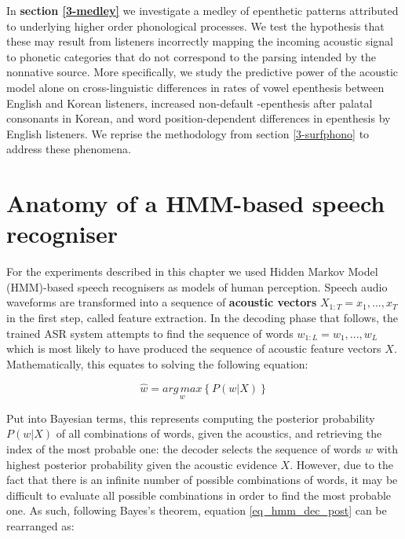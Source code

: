 In \textbf{section \ref{3-medley}} we investigate a medley of epenthetic patterns attributed to underlying higher order phonological processes. We test the hypothesis that these may result from listeners incorrectly mapping the incoming acoustic signal to phonetic categories that do not correspond to the parsing intended by the nonnative source. More specifically, we study the predictive power of the acoustic model alone on cross-linguistic differences in rates of vowel epenthesis between English and Korean listeners, increased non-default -epenthesis after palatal consonants in Korean, and word position-dependent differences in epenthesis by English listeners. We reprise the methodology from section \ref{3-surfphono} to address these phenomena.   


\newpage
\section{Anatomy of a HMM-based speech recogniser} \label{3-hmm}
For the experiments described in this chapter we used Hidden Markov Model (HMM)-based speech recognisers as models of human perception. 
Speech audio waveforms are transformed into a sequence of \textbf{acoustic vectors} $X_{1:T} = x_{1}, ..., x_{T}$ in the first step, called feature extraction. In the decoding phase that follows, the trained ASR system attempts to find the sequence of words $w_{1:L} = w_{1}, ..., w_{L}$ which is most likely to have produced the sequence of acoustic feature vectors $X$.
Mathematically, this equates to solving the following equation:

\begin{equation}
  \widehat{w} = \underset{w}{arg\,max} \left \{  P(w|X)\right \}
  \label{eq_hmm_dec_post}
\end{equation}

Put into Bayesian terms, this represents computing the posterior probability $P(w|X)$ of all combinations of words, given the acoustics, and retrieving the index of the most probable one: the decoder selects the sequence of words $w$ with highest posterior probability given the acoustic evidence $X$. However, due to the fact that there is an infinite number of possible combinations of words, it may be difficult to evaluate all possible combinations in order to find the most probable one. As such, following Bayes's theorem, equation \ref{eq_hmm_dec_post} can be rearranged as:

